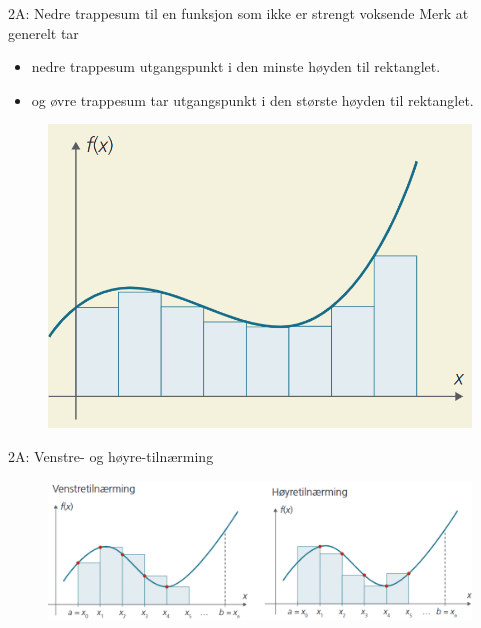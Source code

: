 \blueheader
\begin{frame}{2A: Nedre trappesum til en funksjon som ikke er strengt voksende}
Merk at generelt tar 
\begin{itemize}
    \item nedre trappesum utgangspunkt i den minste høyden til rektanglet.\\
    \item og øvre trappesum tar utgangspunkt i den største høyden til rektanglet.
\end{itemize}
\begin{figure}
    \centering
    \includegraphics[width=0.6\linewidth]{R2-K2A-17.png}
\end{figure}
\end{frame}

\blueheader
\begin{frame}{2A: Venstre- og høyre-tilnærming}
\begin{figure}
    \centering
    \includegraphics[width=\linewidth]{R2-K2B-2.png}
\end{figure}
\end{frame}





